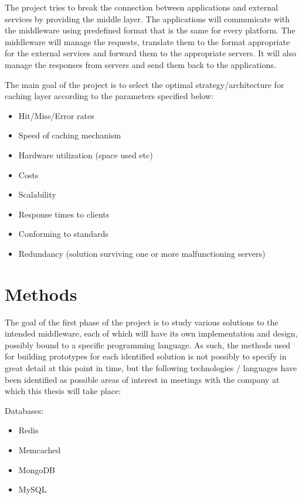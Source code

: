 \documentclass[11pt, a4paper]{scrartcl}
\begin{document}
The project tries to break the connection between applications and external services by providing the middle layer. The applications will communicate with the middleware using predefined format that is the same for every platform. The middleware will manage the requests, translate them to the format appropriate for the external services and forward them to the appropriate servers. It will also manage the responses from servers and send them back to the applications.

The main goal of the project is to select the optimal strategy/architecture for caching layer according to the parameters specified below:

\begin{itemize}
    \item Hit/Miss/Error rates
    \item Speed of caching mechanism
    \item Hardware utilization (space used etc)
    \item Costs
    \item Scalability
    \item Response times to clients
    \item Conforming to standards
    \item Redundancy (solution surviving one or more malfunctioning servers)
\end{itemize}

\section{Methods}

The goal of the first phase of the project is to study various solutions to the intended middleware, each of which will have its own implementation and design, possibly bound to a specific programming language. As such, the methods used for building prototypes for each identified solution is not possibly to specify in great detail at this point in time, but the following technologies / languages have been identified as possible areas of interest in meetings with the company at which this thesis will take place:

Databases:
\begin{itemize}
    \item Redis
    \item Memcached
    \item MongoDB
    \item MySQL
\end{itemize}
\end{document}
